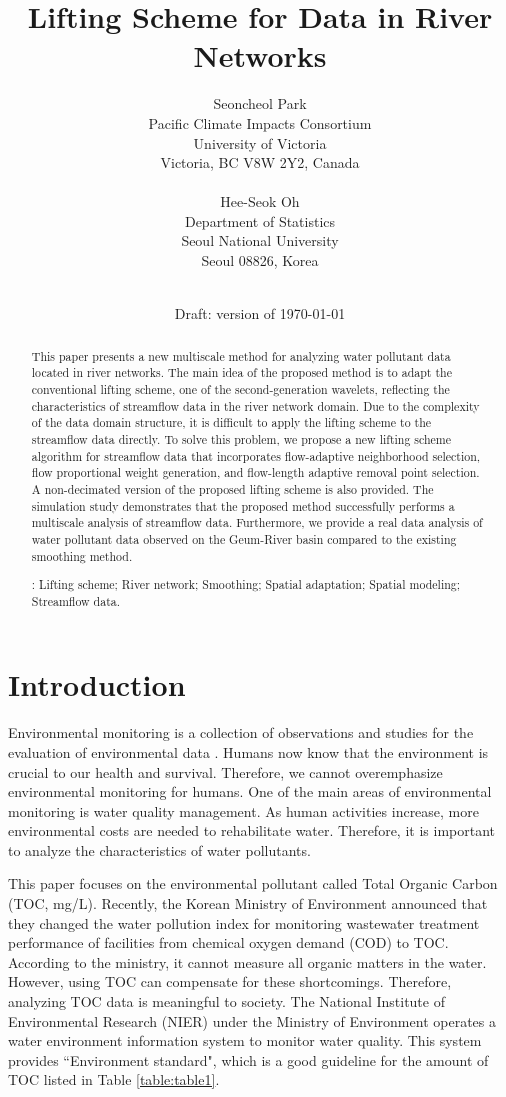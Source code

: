 \documentclass[11pt,titlepage]{article}
\title{\bf Lifting Scheme for Data in River Networks
\medskip
}
\author{
Seoncheol Park \\
Pacific Climate Impacts Consortium\\
University of Victoria\\
Victoria, BC V8W 2Y2, Canada\\
\\
Hee-Seok Oh \\
Department of Statistics\\
Seoul National University\\
Seoul 08826, Korea\\
\\
}
\date{Draft: version of \today}
\begin{document}
\maketitle


\begin{abstract}
This paper presents a new multiscale method for analyzing water pollutant data located in river networks. The main idea of the proposed method is to adapt the conventional lifting scheme, one of the second-generation wavelets, reflecting the characteristics of streamflow data in the river network domain. Due to the complexity of the data domain structure, it is difficult to apply the lifting scheme to the streamflow data directly. To solve this problem, we propose a new lifting scheme algorithm for streamflow data that incorporates flow-adaptive neighborhood selection, flow proportional weight generation, and flow-length adaptive removal point selection. A non-decimated version of the proposed lifting scheme is also provided. The simulation study demonstrates that the proposed method successfully performs a multiscale analysis of streamflow data. Furthermore, we provide a real data analysis of water pollutant data observed on the Geum-River basin compared to the existing smoothing method. 

\vskip 7mm

: Lifting scheme; River network; Smoothing; Spatial adaptation; Spatial modeling; Streamflow data. 

\end{abstract}

\section{Introduction}\label{sec:intro}

Environmental monitoring is a collection of observations and studies for the evaluation of environmental data \citep{Artiola2004}. Humans now know that the environment is crucial to our health and survival. Therefore, we cannot overemphasize  environmental monitoring for humans. One of the main areas of environmental monitoring is water quality management. As human activities increase, more environmental costs are needed to rehabilitate water. Therefore, it is important to analyze the characteristics of water pollutants. 

This paper focuses on the environmental pollutant called Total Organic Carbon (TOC, mg/L). Recently, the Korean Ministry of Environment announced that they changed the water pollution index for monitoring wastewater treatment performance of facilities from chemical oxygen demand (COD) to TOC. According to the ministry, it cannot measure all organic matters in the water. However, using TOC can compensate for these shortcomings. Therefore, analyzing TOC data is meaningful to society.  The National Institute of Environmental Research (NIER) under the Ministry of Environment operates a water environment information system to monitor water quality. This system provides ``Environment standard", which is a good guideline for the amount of TOC listed in Table \ref{table:table1}.
\end{document}
